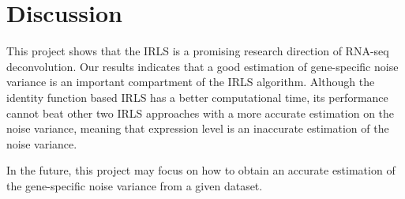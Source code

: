 \documentclass[10pt, a4paper, oneside]{article}
\begin{document}
\section{Discussion}
\justify
This project shows that the IRLS is a promising research direction of RNA-seq deconvolution. Our results indicates that a good estimation 
of gene-specific noise variance is an important compartment of the IRLS algorithm. Although the identity function based IRLS has a better computational time,
its performance cannot beat other two IRLS approaches with a more accurate estimation on the noise variance, meaning that expression level is an inaccurate estimation of the noise variance.

In the future, this project may focus on how to obtain an accurate estimation of the gene-specific noise variance from a given dataset.
\medskip



\end{document}
